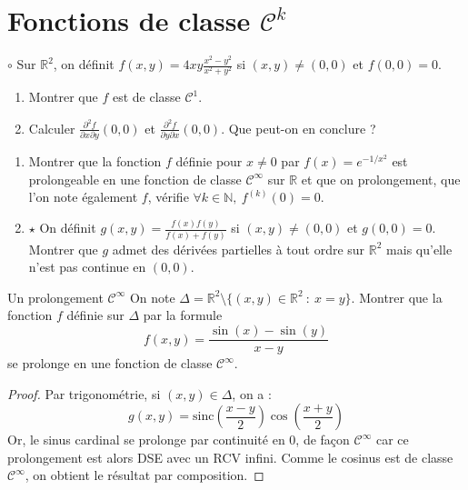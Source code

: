 \documentclass[french,a4paper]{article}
\newcommand{\N}{\mathbb{N}}
\newcommand{\R}{\mathbb{R}}
\theoremstyle{plain}
\theoremstyle{definition}
\theoremstyle{remark}
\begin{document}
\section{Fonctions de classe $\mathcal{C}^k$}

\begin{ex}[Moulin.22]{$\circ$}
	Sur $\R^2$, on définit $f(x,y)=\displaystyle4xy\frac{x^2-y^2}{x^2+y^2}$ si $(x,y)\ne(0,0)$ et $f(0,0)=0$.
	\begin{enumerate}
		\item Montrer que $f$ est de classe $\mathcal{C}^1$.
		\item Calculer $\displaystyle\frac{\partial^2 f}{\partial x\partial y}(0,0)$ et $\displaystyle\frac{\partial^2 f}{\partial y\partial x}(0,0)$. Que peut-on en conclure ?
	\end{enumerate}
\end{ex}

\begin{ex}[Moulin.23]{}
	\begin{enumerate}
		\item Montrer que la fonction $f$ définie pour $x\ne 0$ par $f(x)=e^{-1/x^2}$ est prolongeable en une fonction de classe $\mathcal{C}^\infty$ sur $\R$ et que on prolongement, que l'on note également $f$, vérifie $\forall k\in\N,\ f^{(k)}(0)=0$.
		\item $\star$ On définit $g(x,y)=\displaystyle\frac{f(x)f(y)}{f(x)+f(y)}$ si $(x,y)\ne(0,0)$ et $g(0,0)=0$. \\ Montrer que $g$ admet des dérivées partielles à tout ordre sur $\R^2$ mais qu'elle n'est pas continue en $(0,0)$.
	\end{enumerate}
\end{ex}

\begin{ex}[Moulin.24]{Un prolongement $\mathcal{C}^\infty$}
	On note $\Delta=\R^2\setminus\{(x,y)\in\R^2\ : \ x=y\}$. Montrer que la fonction $f$ définie sur $\Delta$ par la formule $$f(x,y)=\frac{\sin(x)-\sin(y)}{x-y}$$ se prolonge en une fonction de classe $\mathcal{C}^\infty$.
\end{ex}
\begin{proof}
	Par trigonométrie, si $(x,y)\in\Delta$, on a : $$g(x,y)=\text{sinc}\left(\frac{x-y}{2}\right)\cos\left(\frac{x+y}{2}\right)$$ Or, le sinus cardinal se prolonge par continuité en $0$, de façon $\mathcal{C}^\infty$ car ce prolongement est alors DSE avec un RCV infini. Comme le cosinus est de classe $\mathcal{C}^\infty$, on obtient le résultat par composition.
\end{proof}
\end{document}
